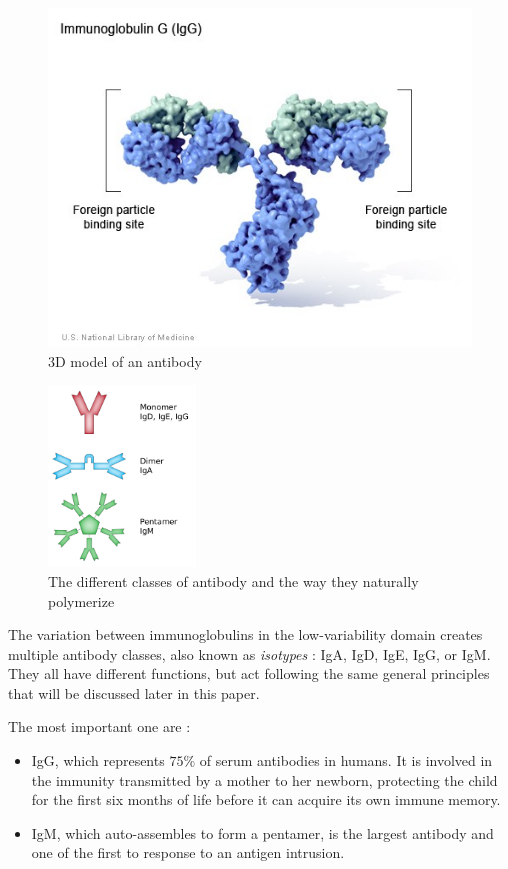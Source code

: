 \begin{figure}[!h]
\begin{minipage}{0.495\textwidth}
        \includegraphics[width=\textwidth]{../Images/immunoglobulin_3D_model.jpg}   
        \caption{3D model of an antibody}
        \label{fig:immunoglobulin_3D_model}
    \end{minipage}
\end{figure}

\begin{figure}%
    \centering
    \includegraphics[width=0.35\textwidth]{../Images/antibody_classes.png}   
    \caption{The different classes of antibody and the way they naturally polymerize}
    \label{fig:antibody_classes}
\end{figure}

The variation between immunoglobulins in the low-variability domain
creates multiple antibody classes, also known as \emph{isotypes} :
IgA, IgD, IgE, IgG, or IgM. They all have different functions, but act
following the same general principles that will be discussed later in this paper.

The most important one are :
\begin{itemize}
    \item IgG, which represents $75\%$ of serum antibodies
    in humans. It is involved in the immunity transmitted by a mother
    to her newborn, protecting the child for the first six months of life
    before it can acquire its own immune memory.
    \item IgM, which auto-assembles to form a pentamer, is the largest
    antibody and one of the first to response to an antigen intrusion.
\end{itemize}



